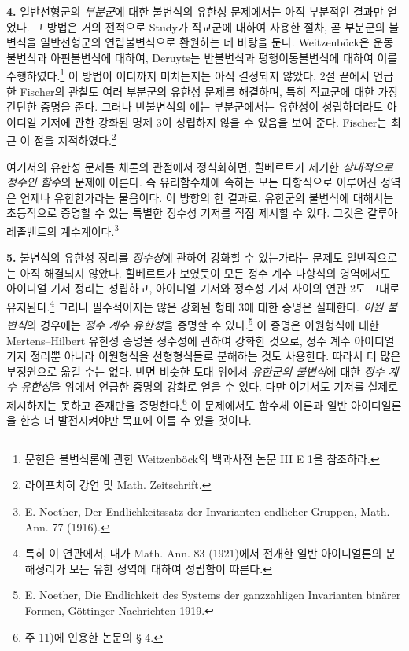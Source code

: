 \textbf{4.} 일반선형군의 \emph{부분군}에 대한 불변식의 유한성 문제에서는 아직 부분적인 결과만 얻었다. 그 방법은 거의 전적으로 Study가 직교군에 대하여 사용한 절차, 곧 부분군의 불변식을 일반선형군의 연립불변식으로 환원하는 데 바탕을 둔다. Weitzenböck은 운동불변식과 아핀불변식에 대하여, Deruyts는 반불변식과 평행이동불변식에 대하여 이를 수행하였다.\footnote{문헌은 불변식론에 관한 Weitzenböck의 백과사전 논문 III E 1을 참조하라.} 이 방법이 어디까지 미치는지는 아직 결정되지 않았다. 2절 끝에서 언급한 Fischer의 관찰도 여러 부분군의 유한성 문제를 해결하며, 특히 직교군에 대한 가장 간단한 증명을 준다. 그러나 반불변식의 예는 부분군에서는 유한성이 성립하더라도 아이디얼 기저에 관한 강화된 명제 3이 성립하지 않을 수 있음을 보여 준다. Fischer는 최근 이 점을 지적하였다.\footnote{라이프치히 강연 및 Math. Zeitschrift.}

여기서의 유한성 문제를 체론의 관점에서 정식화하면, 힐베르트가 제기한 \emph{상대적으로 정수인 함수}의 문제에 이른다. 즉 유리함수체에 속하는 모든 다항식으로 이루어진 정역은 언제나 유한한가라는 물음이다. 이 방향의 한 결과로, 유한군의 불변식에 대해서는 초등적으로 증명할 수 있는 특별한 정수성 기저를 직접 제시할 수 있다. 그것은 갈루아 레졸벤트의 계수계이다.\footnote{E. Noether, Der Endlichkeitssatz der Invarianten endlicher Gruppen, Math. Ann. 77 (1916).}

\textbf{5.} 불변식의 유한성 정리를 \emph{정수성}에 관하여 강화할 수 있는가라는 문제도 일반적으로는 아직 해결되지 않았다. 힐베르트가 보였듯이 모든 정수 계수 다항식의 영역에서도 아이디얼 기저 정리는 성립하고, 아이디얼 기저와 정수성 기저 사이의 연관 2도 그대로 유지된다.\footnote{특히 이 연관에서, 내가 Math. Ann. 83 (1921)에서 전개한 일반 아이디얼론의 분해정리가 모든 유한 정역에 대하여 성립함이 따른다.} 그러나 필수적이지는 않은 강화된 형태 3에 대한 증명은 실패한다. \emph{이원 불변식}의 경우에는 \emph{정수 계수 유한성}을 증명할 수 있다.\footnote{E. Noether, Die Endlichkeit des Systems der ganzzahligen Invarianten binärer Formen, Göttinger Nachrichten 1919.} 이 증명은 이원형식에 대한 Mertens--Hilbert 유한성 증명을 정수성에 관하여 강화한 것으로, 정수 계수 아이디얼 기저 정리뿐 아니라 이원형식을 선형형식들로 분해하는 것도 사용한다. 따라서 더 많은 부정원으로 옮길 수는 없다. 반면 비슷한 토대 위에서 \emph{유한군의 불변식}에 대한 \emph{정수 계수 유한성}을 위에서 언급한 증명의 강화로 얻을 수 있다. 다만 여기서도 기저를 실제로 제시하지는 못하고 존재만을 증명한다.\footnote{주 11)에 인용한 논문의 § 4.} 이 문제에서도 함수체 이론과 일반 아이디얼론을 한층 더 발전시켜야만 목표에 이를 수 있을 것이다.

